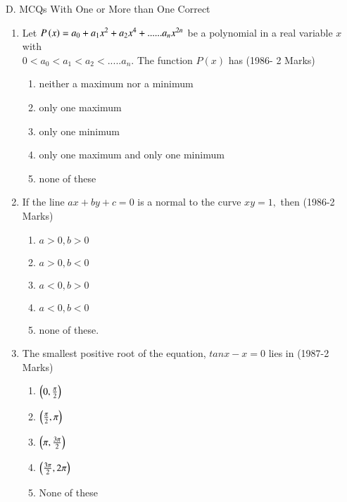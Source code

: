 \documentclass[journal,12pt,twocolumn]{IEEEtran}
\theoremstyle{remark}
\begin{document}
    D. MCQs With One or More than One Correct
 \begin{enumerate}
     \item 
	     Let $P\left(x\right) = a_0+ a_1x^2+a_2x^4+......a_nx^{2n}$ be a polynomial in a real variable $x$ with \\
      $0<a_0<a_1<a_2<.....a_n.$ The function $P(x)$ has 
	 \hfill(1986- 2 Marks)
      \begin{enumerate}

         \item neither a maximum nor a minimum
 
         \item only one maximum

         \item only one minimum

         \item only one maximum and only one minimum
   
         \item none of these\\

      \end{enumerate} 

      \item
       If the line $ax+by+c = 0$ is a normal to the curve $xy=1,$ then 
	 \hfill(1986-2 Marks)
        \begin{enumerate}
         \item $a>0,b>0$ 
         \item $a>0,b<0$ 
         \item $a<0,b>0$
         \item $a<0,b<0$
         \item none of these.
       \end{enumerate}

      \item 
      The smallest positive root of the equation, $tanx-x=0$ lies in 
	\hfill(1987-2 Marks)
      \begin{enumerate}
       \item $\left(0,\frac{\pi}{2}\right)$
       \item $\left(\frac{\pi}{2},\pi\right)$
       \item $\left(\pi,\frac{3\pi}{2}\right)$
       \item $\left(\frac{3\pi}{2},2\pi\right)$
       \item None of these\\
      \end{enumerate}


\end{enumerate}
\end{document}
